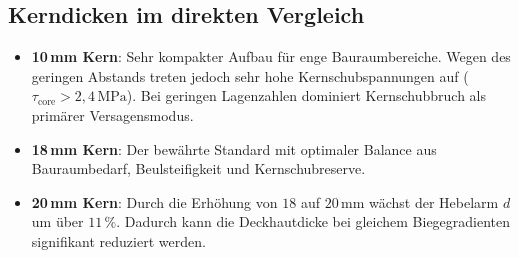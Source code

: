 \subsection*{Kerndicken im direkten Vergleich}
\begin{itemize}
    \item \textbf{10\,mm Kern}: Sehr kompakter Aufbau für enge Bauraumbereiche. Wegen des geringen Abstands treten jedoch sehr hohe Kernschubspannungen auf ($\tau_{\text{core}} > 2{,}4\,\text{MPa}$). Bei geringen Lagenzahlen dominiert Kernschubbruch als primärer Versagensmodus.
    \item \textbf{18\,mm Kern}: Der bewährte Standard mit optimaler Balance aus Bauraumbedarf, Beulsteifigkeit und Kernschubreserve.
    \item \textbf{20\,mm Kern}: Durch die Erhöhung von $18$ auf $20\,\text{mm}$ wächst der Hebelarm $d$ um über $11\,\%$. Dadurch kann die Deckhautdicke bei gleichem Biegegradienten signifikant reduziert werden.
\end{itemize}
